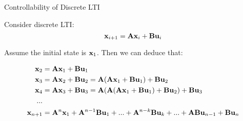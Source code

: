 \documentclass{beamer}
\begin{document}
\begin{frame}{Controllability of Discrete LTI}
\begin{flushleft}

Consider discrete LTI:
\begin{equation}
\mathbf{x}_{i+1} = \mathbf{A}  \mathbf{x}_i + \mathbf{B} \mathbf{u}_i
\end{equation}

Assume the initial state is $\mathbf{x}_1$. Then we can deduce that:

\begin{align*}
\mathbf{x}_2 &= \mathbf{A} \mathbf{x}_1 + \mathbf{B} \mathbf{u}_1 \\
\mathbf{x}_3 &= \mathbf{A} \mathbf{x}_2 + \mathbf{B} \mathbf{u}_2 = \mathbf{A} (\mathbf{A} \mathbf{x}_1 + \mathbf{B} \mathbf{u}_1) + \mathbf{B} \mathbf{u}_2 \\
\mathbf{x}_4 &= \mathbf{A} \mathbf{x}_3 + \mathbf{B} \mathbf{u}_3 = \mathbf{A} (\mathbf{A} (\mathbf{A} \mathbf{x}_1 + \mathbf{B} \mathbf{u}_1) + \mathbf{B} \mathbf{u}_2) + \mathbf{B} \mathbf{u}_3 \\
... \\
\mathbf{x}_{n+1} &= \mathbf{A}^n \mathbf{x}_1 + \mathbf{A}^{n-1} \mathbf{B} \mathbf{u}_1 + ... + 
\mathbf{A}^{n - k} \mathbf{B} \mathbf{u}_{k} + ... + 
\mathbf{A} \mathbf{B} \mathbf{u}_{n-1} +
\mathbf{B} \mathbf{u}_n
\end{align*}

\end{flushleft}
\end{frame}
\end{document}
